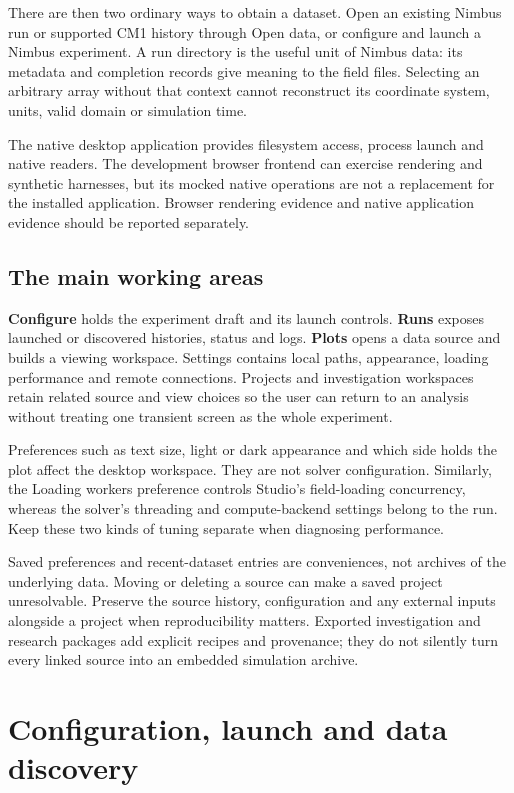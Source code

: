 There are then two ordinary ways to obtain a dataset. Open an existing Nimbus
run or supported CM1 history through Open data, or configure and launch a Nimbus
experiment. A run directory is the useful unit of Nimbus data: its metadata and
completion records give meaning to the field files. Selecting an arbitrary array
without that context cannot reconstruct its coordinate system, units, valid
domain or simulation time.

The native desktop application provides filesystem access, process launch and
native readers. The development browser frontend can exercise rendering and
synthetic harnesses, but its mocked native operations are not a replacement for
the installed application. Browser rendering evidence and native application
evidence should be reported separately.

\subsection{The main working areas}
\textbf{Configure} holds the experiment draft and its launch controls.
\textbf{Runs} exposes launched or discovered histories, status and logs.
\textbf{Plots} opens a data source and builds a viewing workspace. Settings
contains local paths, appearance, loading performance and remote connections.
Projects and investigation workspaces retain related source and view choices so
the user can return to an analysis without treating one transient screen as the
whole experiment.

Preferences such as text size, light or dark appearance and which side holds the
plot affect the desktop workspace. They are not solver configuration. Similarly,
the Loading workers preference controls Studio's field-loading concurrency,
whereas the solver's threading and compute-backend settings belong to the run.
Keep these two kinds of tuning separate when diagnosing performance.

Saved preferences and recent-dataset entries are conveniences, not archives of
the underlying data. Moving or deleting a source can make a saved project
unresolvable. Preserve the source history, configuration and any external inputs
alongside a project when reproducibility matters. Exported investigation and
research packages add explicit recipes and provenance; they do not silently turn
every linked source into an embedded simulation archive.

\section{Configuration, launch and data discovery}
